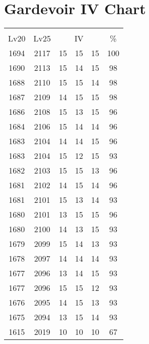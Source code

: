 \documentclass{article}%
\begin{document}
%
\normalsize%
\section{Gardevoir IV Chart}%
\label{sec:Gardevoir IV Chart}%
\renewcommand{\arraystretch}{1.5}%
\begin{tabular}{|c|c|c|c|c|c|}%
\hline%
\multicolumn{6}{|c|}{\textcolor{white}{ 
\linebreak{Gardevoir}
}%
\cellcolor{black}}\\%
\multicolumn{1}{|c}{Lv20}&\multicolumn{1}{c|}{Lv25}&\multicolumn{3}{c|}{IV}&\multicolumn{1}{|c|}{\%}\\%
\hline%
\rowcolor{color100}%
1694&2117&15&15&15&100\\%
\hline%
\rowcolor{color98}%
1690&2113&15&14&15&98\\%
\hline%
\rowcolor{color98}%
1688&2110&15&15&14&98\\%
\hline%
\rowcolor{color98}%
1687&2109&14&15&15&98\\%
\hline%
\rowcolor{color96}%
1686&2108&15&13&15&96\\%
\hline%
\rowcolor{color96}%
1684&2106&15&14&14&96\\%
\hline%
\rowcolor{color96}%
1683&2104&14&14&15&96\\%
\hline%
\rowcolor{color93}%
1683&2104&15&12&15&93\\%
\hline%
\rowcolor{color96}%
1682&2103&15&15&13&96\\%
\hline%
\rowcolor{color96}%
1681&2102&14&15&14&96\\%
\hline%
\rowcolor{color93}%
1681&2101&15&13&14&93\\%
\hline%
\rowcolor{color96}%
1680&2101&13&15&15&96\\%
\hline%
\rowcolor{color93}%
1680&2100&14&13&15&93\\%
\hline%
\rowcolor{color93}%
1679&2099&15&14&13&93\\%
\hline%
\rowcolor{color93}%
1678&2097&14&14&14&93\\%
\hline%
\rowcolor{color93}%
1677&2096&13&14&15&93\\%
\hline%
\rowcolor{color93}%
1677&2096&15&15&12&93\\%
\hline%
\rowcolor{color93}%
1676&2095&14&15&13&93\\%
\hline%
\rowcolor{color93}%
1675&2094&13&15&14&93\\%
\hline%
\rowcolor{color91}%
1615&2019&10&10&10&67\\%
\end{tabular}

%
\end{document}
